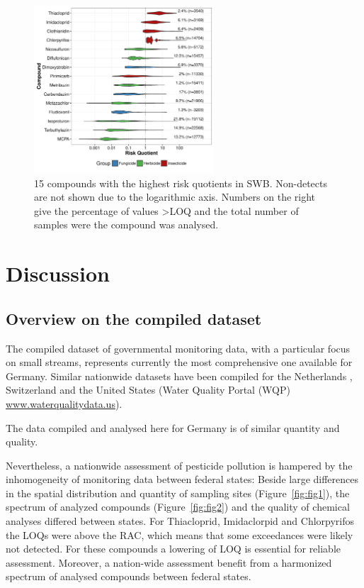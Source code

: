 \documentclass[journal=esthag,manuscript=article]{achemso}
\begin{document}
\begin{figure}[ht]
  \includegraphics[width=0.6\textwidth]{figure6.pdf}
  \caption{15 compounds with the highest risk quotients in SWB. Non-detects are not shown due to the logarithmic axis. Numbers on the right give the percentage of values \textgreater LOQ and the total number of samples were the compound was analysed.
  }
  \label{fig:fig6}
\end{figure}




\section{Discussion}
\subsection{Overview on the compiled dataset}
The compiled dataset of governmental monitoring data, with a particular focus on small streams, represents currently the most comprehensive one available for Germany.
Similar nationwide datasets have been compiled for the Netherlands \citep{vijver_spatial_2008}, Switzerland \citep{munz_pestizidmessungen_2011} and the United States (Water Quality Portal (WQP) \url{www.waterqualitydata.us}).

The data compiled and analysed here for Germany is of similar quantity and quality.


Nevertheless, a nationwide assessment of pesticide pollution is hampered by the inhomogeneity of monitoring data between federal states:
Beside large differences in the spatial distribution and quantity of sampling sites (Figure~\ref{fig:fig1}), the spectrum of analyzed compounds (Figure~\ref{fig:fig2}) and the quality of chemical analyses differed between states.
For Thiacloprid, Imidaclorpid and Chlorpyrifos the LOQs were above the RAC, which means that some exceedances were likely not detected.
For these compounds a lowering of LOQ is essential for reliable assessment.
Moreover, a nation-wide assessment benefit from a harmonized spectrum of analysed compounds between federal states.
\end{document}
